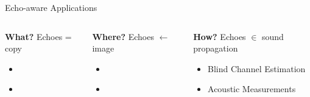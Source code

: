 \begin{frame}[t]{Echo-aware Applications \hfill\faBook}
    \pause[5]
    \begin{columns}[T,onlytextwidth]
        \begin{block}{\textbf{What?}}
            \small
            Echoes = copy

            \vspace{-2mm}
            \begin{itemize}
                \item {}
                \\{\footnotesize\cite{leglaive2016multichannel}}
                \item {}
                \\{\footnotesize\cite{flanagan1993spatially,dokmanic2015raking,kowalczyk2019raking}}
            \end{itemize}
        \end{block}
        \begin{block}{\textbf{Where?}}
            \small
            Echoes $\gets$ image

            \vspace{-2mm}
            \begin{itemize}
                \item {}
                \\{\footnotesize\cite{ribeiro2010turning,jensen2019method}}
                \item {}
                \\{\footnotesize\cite{antonacci2012inference,crocco2017uncalibrated}}
            \end{itemize}
        \end{block}
        \begin{block}{\textbf{How?}}
            \small
            Echoes $\in$ sound propagation

            \vspace{-2mm}
            \begin{itemize}
                \item Blind Channel Estimation
                \\{\footnotesize\cite{lin2007blind,crocco2017uncalibrated}}
                \item Acoustic Measurements
                \\{\footnotesize\cite{eaton2015ace,kuttruff2016room}}
            \end{itemize}
        \end{block}
    \end{columns}


\end{frame}
